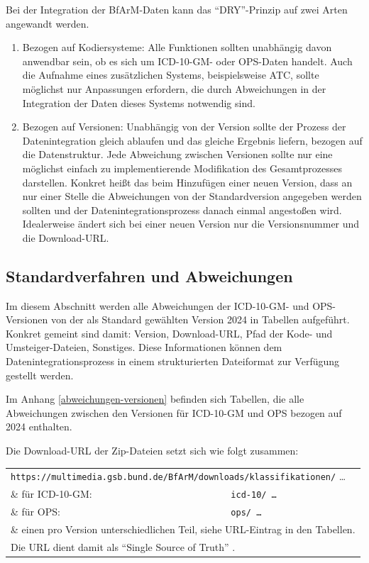 Bei der Integration der BfArM-Daten kann das "`DRY"'-Prinzip auf zwei Arten angewandt werden.

\begin{enumerate}
\item Bezogen auf Kodiersysteme: Alle Funktionen sollten unabhängig davon anwendbar sein, ob es sich um ICD-10-GM- oder OPS-Daten handelt. Auch die Aufnahme eines zusätzlichen Systems, beispielsweise ATC, sollte möglichst nur Anpassungen erfordern, die durch Abweichungen in der Integration der Daten dieses Systems notwendig sind. 
\item Bezogen auf Versionen: Unabhängig von der Version sollte der Prozess der Datenintegration gleich ablaufen und das gleiche Ergebnis liefern, bezogen auf die Datenstruktur. Jede Abweichung zwischen Versionen sollte nur eine möglichst einfach zu implementierende Modifikation des Gesamtprozesses darstellen. Konkret heißt das beim Hinzufügen einer neuen Version, dass an nur einer Stelle die Abweichungen von der Standardversion angegeben werden sollten und der Datenintegrationsprozess danach einmal angestoßen wird. Idealerweise ändert sich bei einer neuen Version nur die Versionsnummer und die Download-URL. 
\end{enumerate}

\subsection{Standardverfahren und Abweichungen}
\label{struktdateiversionen}

Im diesem Abschnitt werden alle Abweichungen der ICD-10-GM- und OPS-Versionen von der als Standard gewählten Version 2024 in Tabellen aufgeführt. Konkret gemeint sind damit: Version, Download-URL, Pfad der Kode- und Umsteiger-Dateien, Sonstiges. Diese Informationen können dem Datenintegrationsprozess in einem strukturierten Dateiformat zur Verfügung gestellt werden.


Im Anhang \ref{abweichungen-versionen} befinden sich Tabellen, die alle Abweichungen zwischen den Versionen für ICD-10-GM und OPS bezogen auf 2024 enthalten.


Die Download-URL der Zip-Dateien setzt sich wie folgt zusammen:

\begingroup
\renewcommand{\arraystretch}{1.0}
\begin{tabular}{p{4cm}l}
\multicolumn{2}{l}{\texttt{https://multimedia.gsb.bund.de/BfArM/downloads/klassifikationen/} \ldots} \\
\& für ICD-10-GM: & \texttt{icd-10/ \ldots} \\
\& für OPS: & \texttt{ops/ \ldots} \\
\multicolumn{2}{l}{\& einen pro Version unterschiedlichen Teil, siehe URL-Eintrag in den Tabellen.} \\
\multicolumn{2}{l}{Die URL dient damit als "`Single Source of Truth"' \cite[Seite 257]{bonnefoy2024definitive}.} \\
\end{tabular}
\endgroup \\


